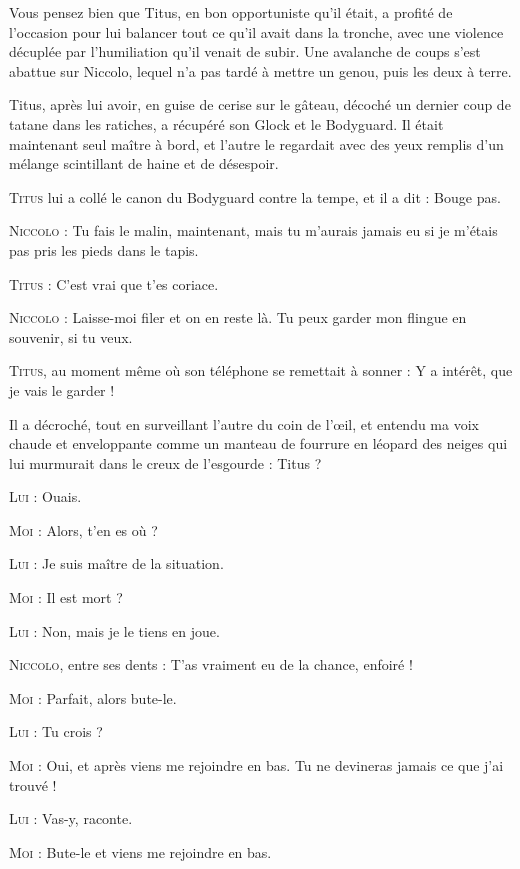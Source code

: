 Vous pensez bien que Titus, en bon opportuniste qu’il était, a profité de l’occasion pour lui balancer tout ce qu’il avait dans la tronche, avec une violence décuplée par l’humiliation qu’il venait de subir. Une avalanche de coups s’est abattue sur Niccolo, lequel n’a pas tardé à mettre un genou, puis les deux à terre.

Titus, après lui avoir, en guise de cerise sur le gâteau, décoché un dernier coup de tatane dans les ratiches, a récupéré son Glock et le Bodyguard. Il était maintenant seul maître à bord, et l’autre le regardait avec des yeux remplis d’un mélange scintillant de haine et de désespoir.

\begin{dialogue}

\textsc{Titus} lui a collé le canon du Bodyguard contre la tempe, et il a dit : Bouge pas.

\textsc{Niccolo} : Tu fais le malin, maintenant, mais tu m’aurais jamais eu si je m’étais pas pris les pieds dans le tapis.

\textsc{Titus} : C’est vrai que t’es coriace.

\textsc{Niccolo} : Laisse-moi filer et on en reste là. Tu peux garder mon flingue en souvenir, si tu veux.

\textsc{Titus}, au moment même où son téléphone se remettait à sonner : Y a intérêt, que je vais le garder !

Il a décroché, tout en surveillant l’autre du coin de l’œil, et entendu ma voix chaude et enveloppante comme un manteau de fourrure en léopard des neiges qui lui murmurait dans le creux de l’esgourde : Titus ?

\textsc{Lui} : Ouais.

\textsc{Moi} : Alors, t’en es où ?

\textsc{Lui} : Je suis maître de la situation.

\textsc{Moi} : Il est mort ?

\textsc{Lui} : Non, mais je le tiens en joue.

\textsc{Niccolo}, entre ses dents : T’as vraiment eu de la chance, enfoiré !

\textsc{Moi} : Parfait, alors bute-le.

\textsc{Lui} : Tu crois ?

\textsc{Moi} : Oui, et après viens me rejoindre en bas. Tu ne devineras jamais ce que j’ai trouvé !

\textsc{Lui} : Vas-y, raconte.

\textsc{Moi} : Bute-le et viens me rejoindre en bas.


\end{dialogue}
